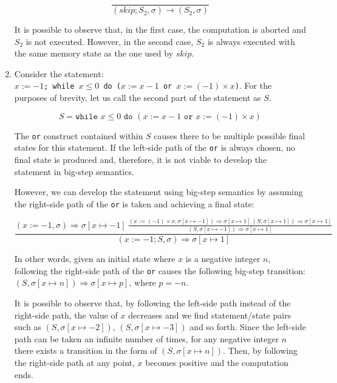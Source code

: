\documentclass[11pt]{article}
\begin{document}
\begin{enumerate}
		\begin{equation*}
			\frac{}{(skip; S_2,\sigma)\rightarrow (S_2,\sigma)}	
		\end{equation*}

		It is possible to observe that, in the first case, the computation is aborted and $S_2$ is not executed. However, in the second case, $S_2$ is always executed with the same memory state as the one used by $skip$.
		
	\item Consider the statement:\\ \texttt{$x:= -1$; while $x\leq 0$ do ($x:=x-1$ or $x:= (-1)\times x$)}.
	For the purposes of brevity, let us call the second part of the statement as $S$.
	
	\begin{equation*}
		S = \texttt{while }x\leq 0\texttt{ do }(x:=x-1\texttt{ or }x:= (-1)\times x)
	\end{equation*}
	
	The \texttt{or} construct contained within $S$ causes there to be multiple possible final states for this statement. If the left-side path of the \texttt{or} is always chosen, no final state is produced and, therefore, it is not viable to develop the statement in big-step semantics.
	
	However, we can develop the statement using big-step semantics by assuming the right-side path of the \texttt{or} is taken and achieving a final state:
	
	\begin{equation*}
		\frac{(x:=-1,\sigma)\Rightarrow\sigma[x\mapsto-1]\ \frac{(x:=(-1)\times x,\sigma[x\mapsto -1])\Rightarrow\sigma[x\mapsto1]\ (S;\sigma[x\mapsto 1])\Rightarrow\sigma[x\mapsto 1]}{(S,\sigma[x\mapsto -1])\Rightarrow \sigma[x\mapsto 1]}}{(x:=-1;S,\sigma)\Rightarrow\sigma[x\mapsto 1]}
	\end{equation*}
	
	In other words, given an initial state where $x$ is a negative integer $n$, following the right-side path of the \texttt{or} causes the following big-step transition: $(S,\sigma[x\mapsto n]) \Rightarrow \sigma[x\mapsto p]$, where $p = -n$.
	
	It is possible to observe that, by following the left-side path instead of the right-side path, the value of $x$ decreases and we find statement/state pairs such as $(S,\sigma[x\mapsto -2])$, $(S,\sigma[x\mapsto -3])$ and so forth. Since the left-side path can be taken an infinite number of times, for any negative integer $n$ there exists a transition in the form of $(S,\sigma[x\mapsto n])$. Then, by following the right-side path at any point, $x$ becomes positive and the computation ends.
	

\end{enumerate}
\end{document}
